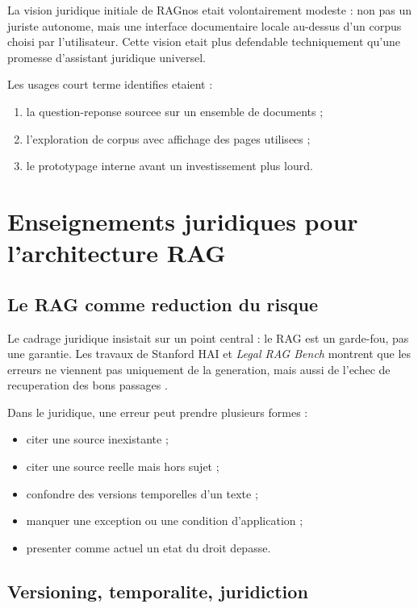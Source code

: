 \documentclass[11pt,a4paper]{article}
\begin{document}
La vision juridique initiale de RAGnos etait volontairement modeste : non pas un juriste autonome, mais une interface documentaire locale au-dessus d'un corpus choisi par l'utilisateur. Cette vision etait plus defendable techniquement qu'une promesse d'assistant juridique universel.

Les usages court terme identifies etaient :

\begin{enumerate}
  \item la question-reponse sourcee sur un ensemble de documents ;
  \item l'exploration de corpus avec affichage des pages utilisees ;
  \item le prototypage interne avant un investissement plus lourd.
\end{enumerate}

\section{Enseignements juridiques pour l'architecture RAG}

\subsection{Le RAG comme reduction du risque}

Le cadrage juridique insistait sur un point central : le RAG est un garde-fou, pas une garantie. Les travaux de Stanford HAI et \emph{Legal RAG Bench} montrent que les erreurs ne viennent pas uniquement de la generation, mais aussi de l'echec de recuperation des bons passages \autocite{stanfordLegalHallucinations2024,legalRAGBench2026}.

Dans le juridique, une erreur peut prendre plusieurs formes :

\begin{itemize}
  \item citer une source inexistante ;
  \item citer une source reelle mais hors sujet ;
  \item confondre des versions temporelles d'un texte ;
  \item manquer une exception ou une condition d'application ;
  \item presenter comme actuel un etat du droit depasse.
\end{itemize}

\subsection{Versioning, temporalite, juridiction}
\end{document}
